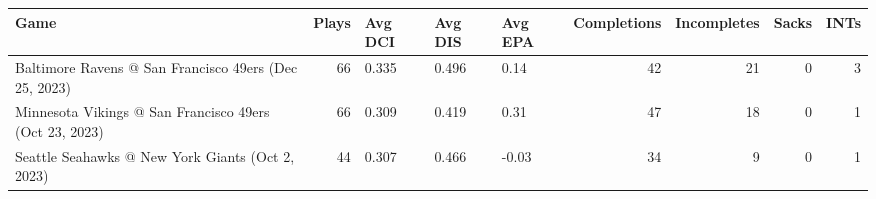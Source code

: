 \begin{tabular}{lrlllrrrr}
\toprule
Game & Plays & Avg DCI & Avg DIS & Avg EPA & Completions & Incompletes & Sacks & INTs \\
\midrule
Baltimore Ravens @ San Francisco 49ers (Dec 25, 2023) & 66 & 0.335 & 0.496 & 0.14 & 42 & 21 & 0 & 3 \\
Minnesota Vikings @ San Francisco 49ers (Oct 23, 2023) & 66 & 0.309 & 0.419 & 0.31 & 47 & 18 & 0 & 1 \\
Seattle Seahawks @ New York Giants (Oct 2, 2023) & 44 & 0.307 & 0.466 & -0.03 & 34 & 9 & 0 & 1 \\
\bottomrule
\end{tabular}
